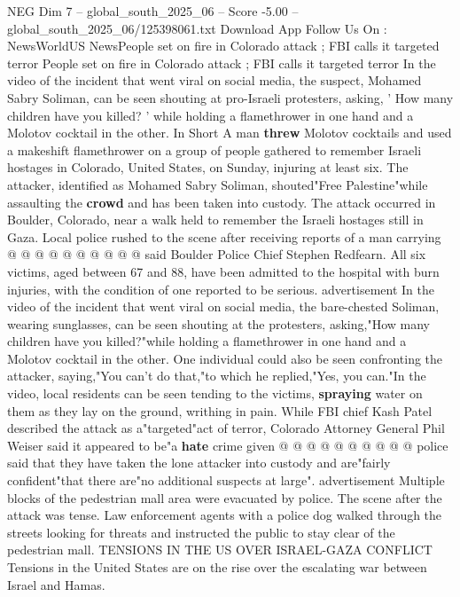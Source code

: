 \begin{textsample}{NEG Dim 7 – global\_south\_2025\_06 – Score -5.00 – global\_south\_2025\_06/125398061.txt}  \label{ex:f7_neg_274}
Download App Follow Us On : NewsWorldUS NewsPeople set on fire in Colorado attack ; FBI calls it targeted terror People set on fire in Colorado attack ; FBI calls it targeted terror In the video of the incident that went viral on social media, the suspect, Mohamed Sabry Soliman, can be seen shouting at pro-Israeli protesters, asking, ' How many children have you killed? ' while holding a flamethrower in one hand and a Molotov cocktail in the other.
In Short A man \textbf{threw} Molotov cocktails and used a makeshift flamethrower on a group of people gathered to remember Israeli hostages in Colorado, United States, on Sunday, injuring at least six.
The attacker, identified as Mohamed Sabry Soliman, shouted"Free Palestine"while assaulting the \textbf{crowd} and has been taken into custody.
The attack occurred in Boulder, Colorado, near a walk held to remember the Israeli hostages still in Gaza.
Local police rushed to the scene after receiving reports of a man carrying @ @ @ @ @ @ @ @ @ @ said Boulder Police Chief Stephen Redfearn.
All six victims, aged between 67 and 88, have been admitted to the hospital with burn injuries, with the condition of one reported to be serious. advertisement In the video of the incident that went viral on social media, the bare-chested Soliman, wearing sunglasses, can be seen shouting at the protesters, asking,"How many children have you killed?"while holding a flamethrower in one hand and a Molotov cocktail in the other.
One individual could also be seen confronting the attacker, saying,"You can't do that,"to which he replied,"Yes, you can."In the video, local residents can be seen tending to the victims, \textbf{spraying} water on them as they lay on the ground, writhing in pain.
While FBI chief Kash Patel described the attack as a"targeted"act of terror, Colorado Attorney General Phil Weiser said it appeared to be"a \textbf{hate} crime given @ @ @ @ @ @ @ @ @ @ police said that they have taken the lone attacker into custody and are"fairly confident"that there are"no additional suspects at large". advertisement Multiple blocks of the pedestrian mall area were evacuated by police.
The scene after the attack was tense.
Law enforcement agents with a police dog walked through the streets looking for threats and instructed the public to stay clear of the pedestrian mall.
TENSIONS IN THE US OVER ISRAEL-GAZA CONFLICT Tensions in the United States are on the rise over the escalating war between Israel and Hamas.

\end{textsample}
